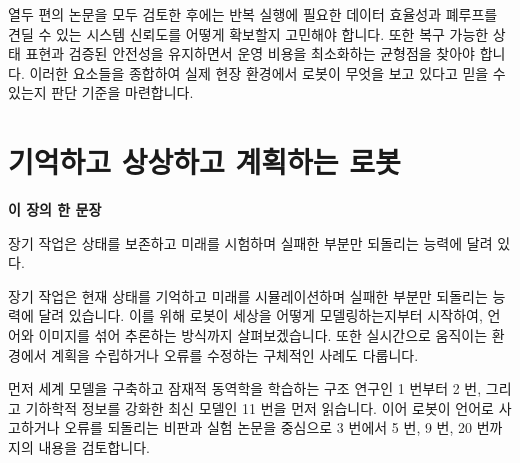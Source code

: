 \documentclass[11pt,openany]{book}
\newcommand{\chaptertakeaway}[1]{%
  \begin{tcolorbox}[
    breakable,
    colback=deepblue,
    colframe=deepblue,
    coltext=white,
    boxrule=0pt,
    arc=2mm,
    left=5mm,right=5mm,top=4mm,bottom=4mm
  ]
  {\sffamily\bfseries\large 이 장의 한 문장}\par\smallskip
  #1
  \end{tcolorbox}
}
\begin{document}
\begin{translationbox}[이 장을 덮기 전에]

열두 편의 논문을 모두 검토한 후에는 반복 실행에 필요한 데이터 효율성과 폐루프를 견딜 수 있는 시스템 신뢰도를 어떻게 확보할지 고민해야 합니다. 또한 복구 가능한 상태 표현과 검증된 안전성을 유지하면서 운영 비용을 최소화하는 균형점을 찾아야 합니다. 이러한 요소들을 종합하여 실제 현장 환경에서 로봇이 무엇을 보고 있다고 믿을 수 있는지 판단 기준을 마련합니다.

\end{translationbox}

\cleardoublepage

\chapter{기억하고 상상하고 계획하는 로봇}

\chaptertakeaway{장기 작업은 상태를 보존하고 미래를 시험하며 실패한 부분만 되돌리는 능력에 달려 있다.}

장기 작업은 현재 상태를 기억하고 미래를 시뮬레이션하며 실패한 부분만 되돌리는 능력에 달려 있습니다. 이를 위해 로봇이 세상을 어떻게 모델링하는지부터 시작하여, 언어와 이미지를 섞어 추론하는 방식까지 살펴보겠습니다. 또한 실시간으로 움직이는 환경에서 계획을 수립하거나 오류를 수정하는 구체적인 사례도 다룹니다.

\begin{boardbox}[읽는 순서]

먼저 세계 모델을 구축하고 잠재적 동역학을 학습하는 구조 연구인 1 번부터 2 번, 그리고 기하학적 정보를 강화한 최신 모델인 11 번을 먼저 읽습니다. 이어 로봇이 언어로 사고하거나 오류를 되돌리는 비판과 실험 논문을 중심으로 3 번에서 5 번, 9 번, 20 번까지의 내용을 검토합니다.

\end{boardbox}
\end{document}
